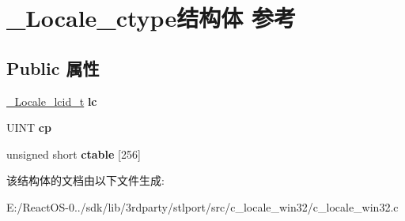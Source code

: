 \hypertarget{struct___locale__ctype}{}\section{\+\_\+\+Locale\+\_\+ctype结构体 参考}
\label{struct___locale__ctype}
\subsection*{Public 属性}
\begin{DoxyCompactItemize}
\item 
\mbox{\label{struct___locale__ctype_a980815429cf755ac4584f80c10854ada}} 
\hyperlink{struct___locale__name__hint}{\+\_\+\+Locale\+\_\+lcid\+\_\+t} {\bfseries lc}
\item 
\mbox{\label{struct___locale__ctype_a61c0220511b9fbbf00267e246115fa9e}} 
U\+I\+NT {\bfseries cp}
\item 
\mbox{\label{struct___locale__ctype_a78d740c42faa294f09e83c771bf57cb7}} 
unsigned short {\bfseries ctable} \mbox{[}256\mbox{]}
\end{DoxyCompactItemize}


该结构体的文档由以下文件生成\+:\begin{DoxyCompactItemize}
\item 
E\+:/\+React\+O\+S-\/0../sdk/lib/3rdparty/stlport/src/c\+\_\+locale\+\_\+win32/c\+\_\+locale\+\_\+win32.\+c\end{DoxyCompactItemize}
